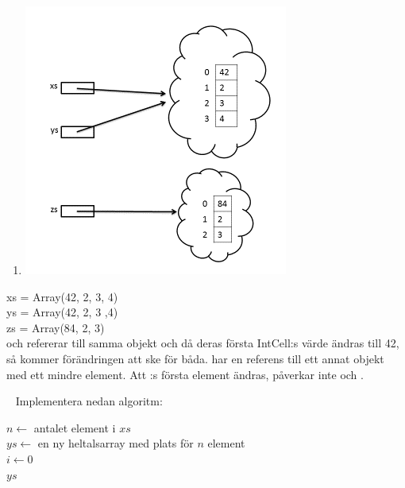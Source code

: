 \begin{enumerate}
\item \includegraphics[scale=1.2]{../img/w05-solutions/memory-pic-6}
\end{enumerate}
xs = Array(42, 2, 3, 4)\\
ys = Array(42, 2, 3 ,4)\\
zs = Array(84, 2, 3)\\
 och  refererar till samma objekt och då deras första IntCell:s värde ändras till 42, så kommer förändringen att ske för båda.
 har en referens till ett annat objekt med ett mindre element. Att :s första element ändras, påverkar inte  och .



\QUESTEND









\QUESTBEGIN

\Task  \what~  Implementera nedan algoritm:

\begin{algorithm}[H]

 $n \leftarrow$ antalet element i $xs$ \\
 $ys \leftarrow$ en ny heltalsarray med plats för $n$ element\\
 $i \leftarrow 0$  \\
 \Return $ys$
\end{algorithm}

